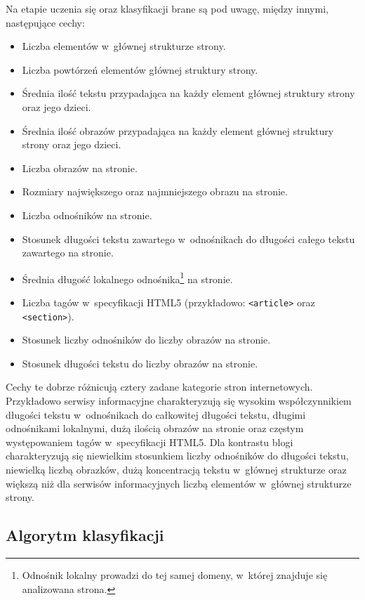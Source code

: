 \documentclass[a4paper,11pt]{article}
\begin{document}
Na etapie uczenia się oraz klasyfikacji brane są pod uwagę, między innymi, następujące cechy:

\begin{itemize}
    \item Liczba elementów w~głównej strukturze strony.
    \item Liczba powtórzeń elementów głównej struktury strony.
    \item Średnia ilość tekstu przypadająca na każdy element głównej struktury strony oraz jego dzieci. 
    \item Średnia ilość obrazów przypadająca na każdy element głównej struktury strony oraz jego dzieci.
    \item Liczba obrazów na stronie.
    \item Rozmiary największego oraz najmniejszego obrazu na stronie.
    \item Liczba odnośników na stronie.
    \item Stosunek długości tekstu zawartego w~odnośnikach do długości całego tekstu zawartego na stronie.
    \item Średnia długość lokalnego odnośnika\footnote{Odnośnik lokalny prowadzi do tej samej domeny, w~której znajduje się analizowana strona.} na stronie.
    \item Liczba tagów w~specyfikacji HTML5 (przykładowo: \verb+<article>+ oraz \verb+<section>+).
    \item Stosunek liczby odnośników do liczby obrazów na stronie.
    \item Stosunek długości tekstu do liczby obrazów na stronie.
\end{itemize}

Cechy te dobrze różnicują cztery zadane kategorie stron internetowych. Przykładowo serwisy informacyjne charakteryzują się wysokim współczynnikiem długości tekstu w~odnośnikach do całkowitej długości tekstu, długimi odnośnikami lokalnymi, dużą ilością obrazów na stronie oraz częstym występowaniem tagów w~specyfikacji HTML5. Dla kontrastu blogi charakteryzują się niewielkim stosunkiem liczby odnośników do długości tekstu, niewielką liczbą obrazków, dużą koncentracją tekstu w~głównej strukturze oraz większą niż dla serwisów informacyjnych liczbą elementów w~głównej strukturze strony.

\subsection{Algorytm klasyfikacji}
\end{document}
